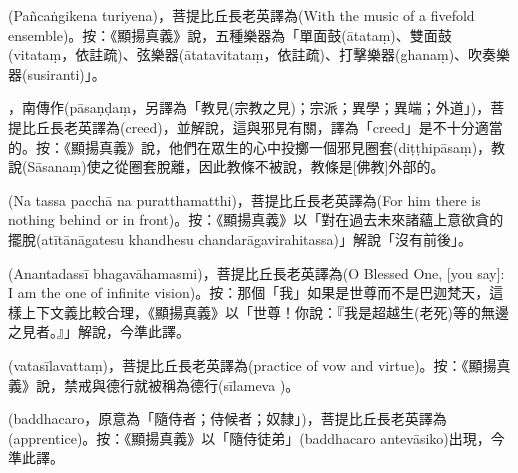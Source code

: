 \startitemgroup[noteitems]
\item{}(Pañcaṅgikena turiyena)，菩提比丘長老英譯為(With the music of a fivefold ensemble)。按：《顯揚真義》說，五種樂器為「單面鼓(ātataṃ)、雙面鼓(vitataṃ，依註疏)、弦樂器(ātatavitataṃ，依註疏)、打擊樂器(ghanaṃ)、吹奏樂器(susiranti)」。
\stopitemgroup

\startitemgroup[noteitems]
\item{}，南傳作(pāsaṇḍaṃ，另譯為「教見(宗教之見)；宗派；異學；異端；外道」)，菩提比丘長老英譯為(creed)，並解說，這與邪見有關，譯為「creed」是不十分適當的。按：《顯揚真義》說，他們在眾生的心中投擲一個邪見圈套(diṭṭhipāsaṃ)，教說(Sāsanaṃ)使之從圈套脫離，因此教條不被說，教條是[佛教]外部的。
\stopitemgroup

\startitemgroup[noteitems]
\item{}(Na tassa pacchā na puratthamatthi)，菩提比丘長老英譯為(For him there is nothing behind or in front)。按：《顯揚真義》以「對在過去未來諸蘊上意欲貪的擺脫(atītānāgatesu khandhesu chandarāgavirahitassa)」解說「沒有前後」。
\stopitemgroup

\startitemgroup[noteitems]
\item{}(Anantadassī bhagavāhamasmi)，菩提比丘長老英譯為(O Blessed One, [you say]: I am the one of infinite vision)。按：那個「我」如果是世尊而不是巴迦梵天，這樣上下文義比較合理，《顯揚真義》以「世尊！你說：『我是超越生(老死)等的無邊之見者。』」解說，今準此譯。
\stopitemgroup

\startitemgroup[noteitems]
\item{}(vatasīlavattaṃ)，菩提比丘長老英譯為(practice of vow and virtue)。按：《顯揚真義》說，禁戒與德行就被稱為德行(sīlameva )。
\stopitemgroup

\startitemgroup[noteitems]
\item{}(baddhacaro，原意為「隨侍者；侍候者；奴隸」)，菩提比丘長老英譯為(apprentice)。按：《顯揚真義》以「隨侍徒弟」(baddhacaro antevāsiko)出現，今準此譯。
\stopitemgroup

